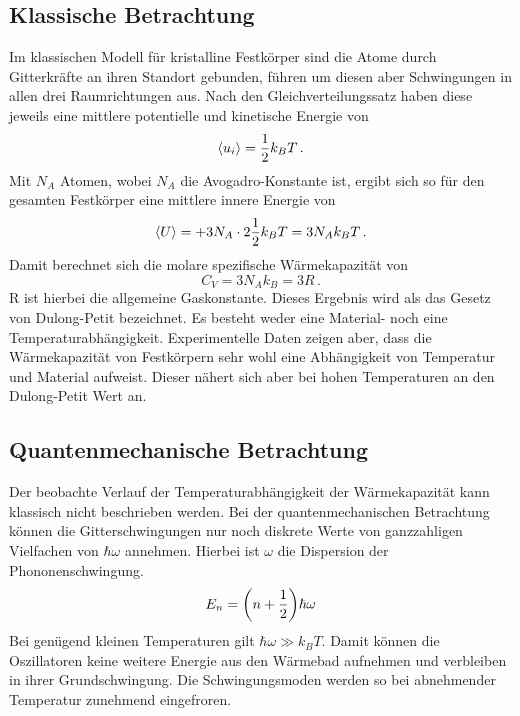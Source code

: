 \subsection{Klassische Betrachtung}

Im klassischen Modell für kristalline Festkörper sind die Atome durch Gitterkräfte an ihren Standort gebunden, führen um diesen aber Schwingungen in allen drei Raumrichtungen  aus. Nach den Gleichverteilungssatz haben diese jeweils eine mittlere potentielle und kinetische Energie von
\begin{equation}
	\expval{u_i} = \frac{1}{2}k_B T \,.
\end{equation}
Mit $N_A$ Atomen, wobei $N_A$ die Avogadro-Konstante ist, ergibt sich so für den gesamten Festkörper eine mittlere innere Energie von
\begin{equation}
	\expval{U} = + 3N_A \cdot 2 \frac{1}{2} k_B T =  3 N_A k_B T \,.
\end{equation}
Damit berechnet sich die molare spezifische Wärmekapazität von
\begin{equation}
	C_V = 3 N_A k_B = 3 R \,.
	\label{eq:D-P}
\end{equation}
R ist hierbei die allgemeine Gaskonstante. Dieses Ergebnis wird als das Gesetz von Dulong-Petit bezeichnet.
Es besteht weder eine Material- noch eine Temperaturabhängigkeit. Experimentelle Daten zeigen aber,  dass die Wärmekapazität von Festkörpern sehr wohl eine Abhängigkeit von Temperatur und Material aufweist. Dieser nähert sich aber bei hohen Temperaturen an den Dulong-Petit Wert an. 

\subsection{Quantenmechanische Betrachtung}

Der beobachte Verlauf der Temperaturabhängigkeit der Wärmekapazität kann klassisch nicht beschrieben werden. Bei der quantenmechanischen Betrachtung können die Gitterschwingungen nur noch diskrete Werte von ganzzahligen Vielfachen von $\hbar \omega$ annehmen. Hierbei ist $\omega$ die Dispersion der Phononenschwingung.
\begin{equation}
	E_n = \qty(n + \frac{1}{2})\hbar \omega
\end{equation}
Bei genügend kleinen Temperaturen gilt $\hbar \omega \gg k_B T$. Damit können die Oszillatoren keine weitere Energie aus den Wärmebad aufnehmen und verbleiben in ihrer Grundschwingung. Die Schwingungsmoden werden so bei abnehmender Temperatur zunehmend eingefroren.

